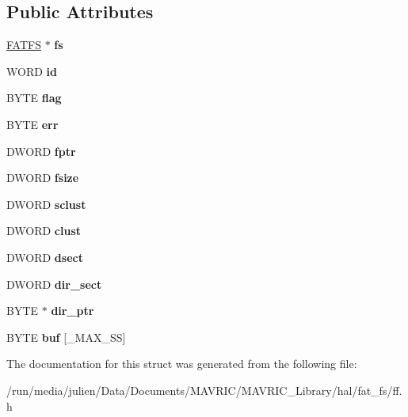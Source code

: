 \subsection*{Public Attributes}
\begin{DoxyCompactItemize}
\item 
\hypertarget{structFIL_a42376a6797a06228911c8b836c1e9030}{\hyperlink{structFATFS}{F\+A\+T\+F\+S} $\ast$ {\bfseries fs}}\label{structFIL_a42376a6797a06228911c8b836c1e9030}

\item 
\hypertarget{structFIL_af7cae0063b0045fb7078b560101ba8f2}{W\+O\+R\+D {\bfseries id}}\label{structFIL_af7cae0063b0045fb7078b560101ba8f2}

\item 
\hypertarget{structFIL_ac409508881f5a16f2998ae675072b376}{B\+Y\+T\+E {\bfseries flag}}\label{structFIL_ac409508881f5a16f2998ae675072b376}

\item 
\hypertarget{structFIL_aea440945db26de9c4a88065c0c887fda}{B\+Y\+T\+E {\bfseries err}}\label{structFIL_aea440945db26de9c4a88065c0c887fda}

\item 
\hypertarget{structFIL_a75d29cf9257c827d117887b9f924c4a9}{D\+W\+O\+R\+D {\bfseries fptr}}\label{structFIL_a75d29cf9257c827d117887b9f924c4a9}

\item 
\hypertarget{structFIL_aa00790d40d7b0081c345fd4f76e22b70}{D\+W\+O\+R\+D {\bfseries fsize}}\label{structFIL_aa00790d40d7b0081c345fd4f76e22b70}

\item 
\hypertarget{structFIL_ad308b74c8d6975c6a9c30d90b4124c40}{D\+W\+O\+R\+D {\bfseries sclust}}\label{structFIL_ad308b74c8d6975c6a9c30d90b4124c40}

\item 
\hypertarget{structFIL_aa41312aba551b9a6d1c9d3c8c7d2734b}{D\+W\+O\+R\+D {\bfseries clust}}\label{structFIL_aa41312aba551b9a6d1c9d3c8c7d2734b}

\item 
\hypertarget{structFIL_ab3d4165d6fd32ac71a130d835fbf0b4d}{D\+W\+O\+R\+D {\bfseries dsect}}\label{structFIL_ab3d4165d6fd32ac71a130d835fbf0b4d}

\item 
\hypertarget{structFIL_ab203794f939ad4480e81dfa488770783}{D\+W\+O\+R\+D {\bfseries dir\+\_\+sect}}\label{structFIL_ab203794f939ad4480e81dfa488770783}

\item 
\hypertarget{structFIL_a5af9e9fb312b629220eaf684dd28c4a9}{B\+Y\+T\+E $\ast$ {\bfseries dir\+\_\+ptr}}\label{structFIL_a5af9e9fb312b629220eaf684dd28c4a9}

\item 
\hypertarget{structFIL_a7a95fb86588663e48309b5cded7e207b}{B\+Y\+T\+E {\bfseries buf} \mbox{[}\+\_\+\+M\+A\+X\+\_\+\+S\+S\mbox{]}}\label{structFIL_a7a95fb86588663e48309b5cded7e207b}

\end{DoxyCompactItemize}


The documentation for this struct was generated from the following file\+:\begin{DoxyCompactItemize}
\item 
/run/media/julien/\+Data/\+Documents/\+M\+A\+V\+R\+I\+C/\+M\+A\+V\+R\+I\+C\+\_\+\+Library/hal/fat\+\_\+fs/ff.\+h\end{DoxyCompactItemize}
